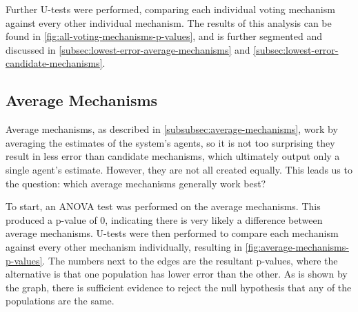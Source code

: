 Further U-tests were performed, comparing each individual voting mechanism against
every other individual mechanism.
The results of this analysis can be found in
\autoref{fig:all-voting-mechanisms-p-values}, and is further segmented and discussed in
\autoref{subsec:lowest-error-average-mechanisms} and
\autoref{subsec:lowest-error-candidate-mechanisms}.

\subsection{Average Mechanisms}\label{subsec:lowest-error-average-mechanisms}
Average mechanisms, as described in \autoref{subsubsec:average-mechanisms}, work by
averaging the estimates of the system's agents, so it is not too surprising they
result in less error than candidate mechanisms, which ultimately output only a single
agent's estimate.
However, they are not all created equally.
This leads us to the question: which average mechanisms generally work best?

To start, an ANOVA test was performed on the average mechanisms.
This produced a p-value of 0, indicating there is very likely a difference between
average mechanisms.
U-tests were then performed to compare each mechanism against every other
mechanism individually, resulting in \autoref{fig:average-mechanisms-p-values}.
The numbers next to the edges are the resultant p-values, where the alternative is
that one population has lower error than the other.
As is shown by the graph, there is sufficient evidence to reject the null hypothesis
that any of the populations are the same.


